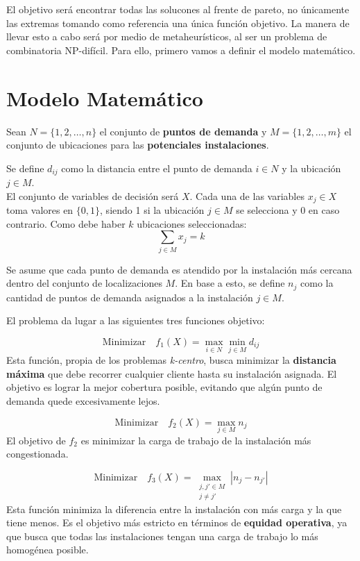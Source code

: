 \documentclass[12pt,a4paper]{book}
\begin{document}
El objetivo será encontrar todas las solucones al frente de pareto, no únicamente las extremas tomando como referencia una única
función objetivo. La manera de llevar esto a cabo será por medio de metaheurísticos, al ser un problema de combinatoria NP-difícil. Para ello, 
primero vamos a definir el modelo matemático.

\section{Modelo Matemático}
Sean $N=\{1, 2, \dots, n\}$ el conjunto de \textbf{puntos de demanda} y $M=\{1, 2, \dots, m\}$ el conjunto de ubicaciones para las \textbf{potenciales instalaciones}.

Se define $d_{ij}$ como la distancia entre el punto de demanda $i \in N$ y la ubicación $j \in M$.\\
El conjunto de variables de decisión será $X$. Cada una de las variables $x_j \in X$ toma valores en $\{0,1\}$, siendo 1 si la ubicación $j \in M$ se selecciona y 0 en caso contrario. Como debe haber $k$ ubicaciones seleccionadas:
\begin{equation}
    \sum_{j \in M} x_j = k
\end{equation}

Se asume que cada punto de demanda es atendido por la instalación más cercana dentro del conjunto de localizaciones $M$. En base a esto, se define $n_j$ como la cantidad de puntos de demanda asignados a la instalación $j \in M$.

El problema da lugar a las siguientes tres funciones objetivo:

\begin{equation}
    \text{Minimizar} \quad f_1(X) = \max_{i \in N} \min_{j \in M} d_{ij}
    \label{eq:f1}
\end{equation}
Esta función, propia de los problemas \textit{k-centro}, busca minimizar la \textbf{distancia máxima} que debe recorrer cualquier cliente hasta su instalación asignada. El objetivo es lograr la mejor cobertura posible, evitando que algún punto de demanda quede excesivamente lejos.

\begin{equation}
    \text{Minimizar} \quad f_2(X) = \max_{j \in M} n_j
    \label{eq:f2}
\end{equation}
El objetivo de $f_2$ es minimizar la carga de trabajo de la instalación más congestionada. 

\begin{equation}
    \text{Minimizar} \quad f_3(X) = \max_{\substack{j, j' \in M \\ j \neq j'}} |n_j - n_{j'}|
    \label{eq:f3}
\end{equation}
Esta función minimiza la diferencia entre la instalación con más carga y la que tiene menos. Es el objetivo más estricto en términos de \textbf{equidad operativa}, ya que busca que todas las instalaciones tengan una carga de trabajo lo más homogénea posible.
\end{document}
